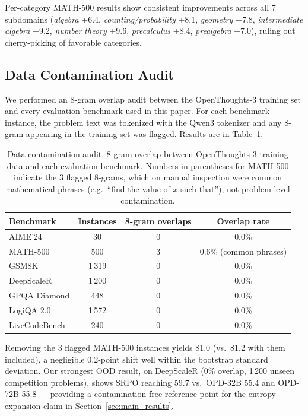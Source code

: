 \documentclass{article}
\newcommand{\method}{SRPO}
\theoremstyle{plain}
\theoremstyle{definition}
\theoremstyle{remark}
\begin{document}
Per-category MATH-500 results show consistent improvements across all 7 subdomains (\textit{algebra} +6.4, \textit{counting/probability} +8.1, \textit{geometry} +7.8, \textit{intermediate algebra} +9.2, \textit{number theory} +9.6, \textit{precalculus} +8.4, \textit{prealgebra} +7.0), ruling out cherry-picking of favorable categories.

\subsection{Data Contamination Audit}
\label{appendix:contamination}

We performed an 8-gram overlap audit between the OpenThoughts-3 training set and every evaluation benchmark used in this paper.
For each benchmark instance, the problem text was tokenized with the Qwen3 tokenizer and any 8-gram appearing in the training set was flagged.
Results are in Table~\ref{tab:contamination}.

\begin{table}[h]
\centering
\caption{Data contamination audit. 8-gram overlap between OpenThoughts-3 training data and each evaluation benchmark. Numbers in parentheses for MATH-500 indicate the 3 flagged 8-grams, which on manual inspection were common mathematical phrases (e.g.\ ``find the value of $x$ such that''), not problem-level contamination.}
\label{tab:contamination}
\vspace{0.5em}
\small
\begin{tabular}{@{}lccc@{}}
\toprule
\textbf{Benchmark} & \textbf{Instances} & \textbf{8-gram overlaps} & \textbf{Overlap rate} \\
\midrule
AIME'24        & 30    & 0   & 0.0\% \\
MATH-500       & 500   & 3   & 0.6\% (common phrases) \\
GSM8K          & 1\,319 & 0   & 0.0\% \\
DeepScaleR     & 1\,200 & 0   & 0.0\% \\
GPQA Diamond   & 448   & 0   & 0.0\% \\
LogiQA 2.0     & 1\,572 & 0   & 0.0\% \\
LiveCodeBench  & 240   & 0   & 0.0\% \\
\bottomrule
\end{tabular}
\end{table}

Removing the 3 flagged MATH-500 instances yields 81.0 (vs.\ 81.2 with them included), a negligible 0.2-point shift well within the bootstrap standard deviation.
Our strongest OOD result, on DeepScaleR (0\% overlap, 1\,200 unseen competition problems), shows \method{} reaching 59.7 vs.\ OPD-32B 55.4 and OPD-72B 55.8 --- providing a contamination-free reference point for the entropy-expansion claim in Section~\ref{sec:main_results}.
\end{document}
